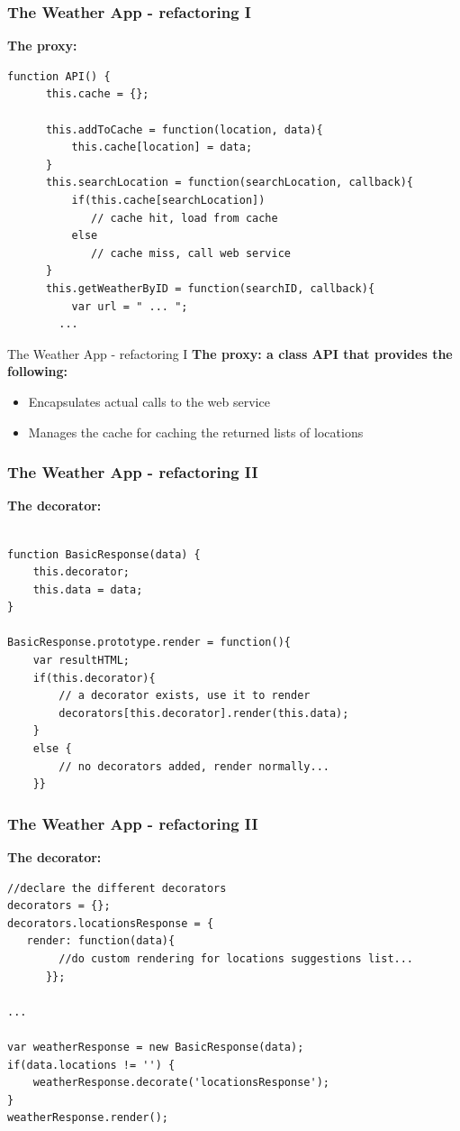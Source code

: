 \documentclass{beamer}
\begin{document}
\begin{frame}[fragile]
\frametitle{The Weather App - refactoring I}
\textbf{The proxy:}
\begin{lstlisting}
function API() {
	  this.cache = {};
	  
	  this.addToCache = function(location, data){
		  this.cache[location] = data; 
	  }
	  this.searchLocation = function(searchLocation, callback){
		  if(this.cache[searchLocation])
		     // cache hit, load from cache
		  else
		     // cache miss, call web service
	  }
	  this.getWeatherByID = function(searchID, callback){
		  var url = " ... ";
        ...
\end{lstlisting}
\end{frame}

\begin{frame}{The Weather App - refactoring I}
\textbf{The proxy: a class API that provides the following:}
   \begin{itemize}
    \item Encapsulates actual calls to the web service
    \item Manages the cache for caching the returned lists of locations
    \end{itemize}
\end{frame}

\begin{frame}[fragile]
\frametitle{The Weather App - refactoring II}
\textbf{The decorator:}
\begin{lstlisting}

function BasicResponse(data) {
    this.decorator;
    this.data = data;
}

BasicResponse.prototype.render = function(){
	var resultHTML;
	if(this.decorator){
		// a decorator exists, use it to render	
	    decorators[this.decorator].render(this.data);
	}
	else {
		// no decorators added, render normally...
	}} 

\end{lstlisting}
\end{frame}

\begin{frame}[fragile]
\frametitle{The Weather App - refactoring II}
\textbf{The decorator:}
\begin{lstlisting}
//declare the different decorators
decorators = {};
decorators.locationsResponse = {
   render: function(data){
		//do custom rendering for locations suggestions list...
	  }};
	  
...

var weatherResponse = new BasicResponse(data); 
if(data.locations != '') {
    weatherResponse.decorate('locationsResponse');
}
weatherResponse.render();

\end{lstlisting}
\end{frame}
\end{document}

